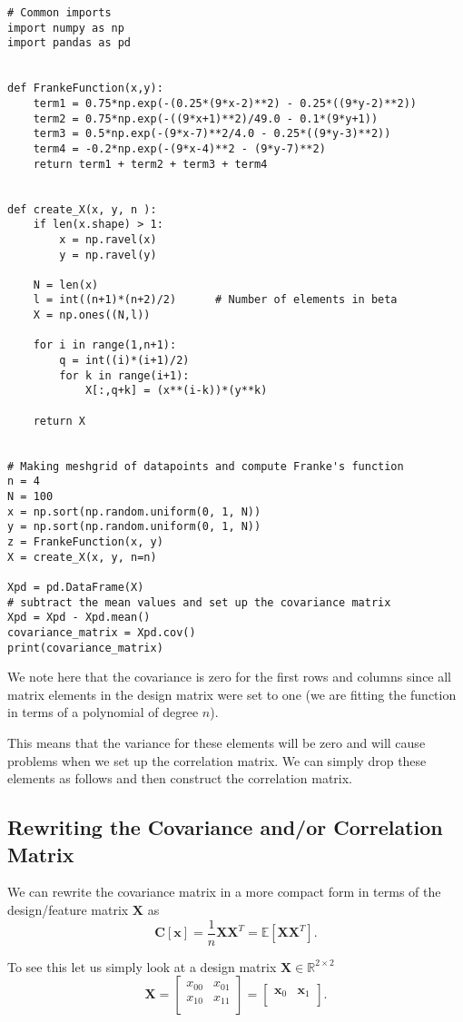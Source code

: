 \documentclass[%
oneside,                 %
final,                   %
10pt]{article}
\begin{document}
\begin{verbatim}
# Common imports
import numpy as np
import pandas as pd


def FrankeFunction(x,y):
	term1 = 0.75*np.exp(-(0.25*(9*x-2)**2) - 0.25*((9*y-2)**2))
	term2 = 0.75*np.exp(-((9*x+1)**2)/49.0 - 0.1*(9*y+1))
	term3 = 0.5*np.exp(-(9*x-7)**2/4.0 - 0.25*((9*y-3)**2))
	term4 = -0.2*np.exp(-(9*x-4)**2 - (9*y-7)**2)
	return term1 + term2 + term3 + term4


def create_X(x, y, n ):
	if len(x.shape) > 1:
		x = np.ravel(x)
		y = np.ravel(y)

	N = len(x)
	l = int((n+1)*(n+2)/2)		# Number of elements in beta
	X = np.ones((N,l))

	for i in range(1,n+1):
		q = int((i)*(i+1)/2)
		for k in range(i+1):
			X[:,q+k] = (x**(i-k))*(y**k)

	return X


# Making meshgrid of datapoints and compute Franke's function
n = 4
N = 100
x = np.sort(np.random.uniform(0, 1, N))
y = np.sort(np.random.uniform(0, 1, N))
z = FrankeFunction(x, y)
X = create_X(x, y, n=n)    

Xpd = pd.DataFrame(X)
# subtract the mean values and set up the covariance matrix
Xpd = Xpd - Xpd.mean()
covariance_matrix = Xpd.cov()
print(covariance_matrix)
\end{verbatim}

We note here that the covariance is zero for the first rows and
columns since all matrix elements in the design matrix were set to one
(we are fitting the function in terms of a polynomial of degree $n$).

This means that the variance for these elements will be zero and will
cause problems when we set up the correlation matrix.  We can simply
drop these elements as follows and then construct the correlation
matrix. 


\subsection*{Rewriting the Covariance and/or Correlation Matrix}

We can rewrite the covariance matrix in a more compact form in terms of the design/feature matrix $\bm{X}$ as 
\[
\bm{C}[\bm{x}] = \frac{1}{n}\bm{X}\bm{X}^T= \mathbb{E}[\bm{X}\bm{X}^T].
\]

To see this let us simply look at a design matrix $\bm{X}\in {\mathbb{R}}^{2\times 2}$
\[
\bm{X}=\begin{bmatrix}
x_{00} & x_{01}\\
x_{10} & x_{11}\\
\end{bmatrix}=\begin{bmatrix}
\bm{x}_{0} & \bm{x}_{1}\\
\end{bmatrix}.
\]
\end{document}
